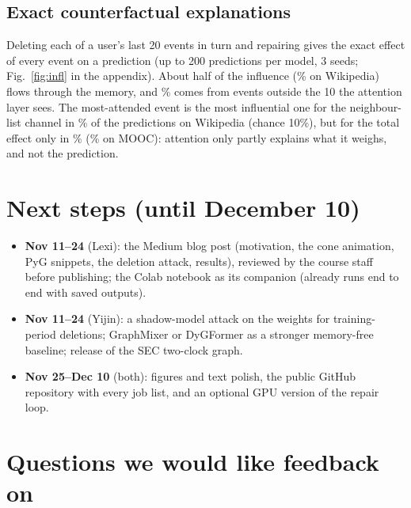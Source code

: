 \documentclass{article}
\begin{document}
\subsection{Exact counterfactual explanations}
\label{sec:infl}

Deleting each of a user's last 20 events in turn and repairing gives the exact effect of every event on a prediction (up to
200 predictions per model, 3 seeds; Fig.~\ref{fig:infl} in the appendix). About half of the influence (\MemChannelWiki\% on
Wikipedia) flows through the memory, and \ShareOutsideWiki\% comes from events outside the 10 the attention layer sees. The
most-attended event is the most influential one for the neighbour-list channel in \AttTopOneListWiki\% of the predictions
on Wikipedia (chance 10\%), but for the total effect only in \AttTopOneTotalWiki\% (\AttTopOneTotalMooc\% on MOOC):
attention only partly explains what it weighs, and not the prediction.

\section{Next steps (until December 10)}
\label{sec:next}

\begin{itemize}
\item \textbf{Nov 11--24} (Lexi): the Medium blog post (motivation, the cone animation, PyG snippets, the deletion attack,
  results), reviewed by the course staff before publishing; the Colab notebook as its companion (already runs end to end
  with saved outputs).
\item \textbf{Nov 11--24} (Yijin): a shadow-model attack on the weights for training-period deletions; GraphMixer or
  DyGFormer as a stronger memory-free baseline; release of the SEC two-clock graph.
\item \textbf{Nov 25--Dec 10} (both): figures and text polish, the public GitHub repository with every job list, and an
  optional GPU version of the repair loop.
\end{itemize}

\section{Questions we would like feedback on}
\label{sec:feedback}
\end{document}
